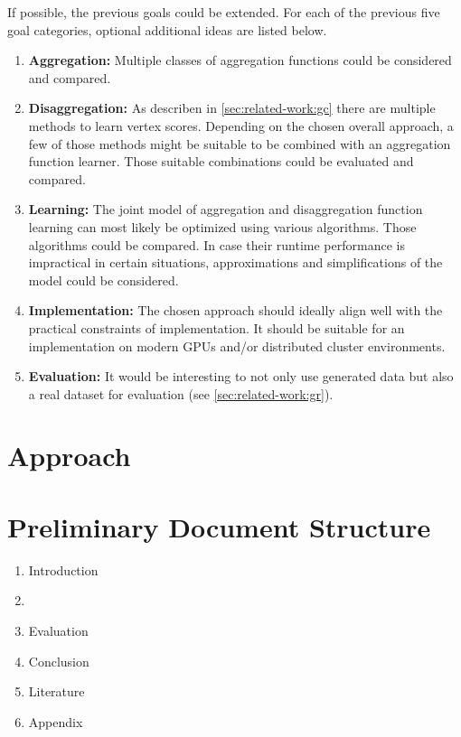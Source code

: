 \documentclass[12pt]{scrartcl}
\begin{document}
If possible, the previous goals could be extended.
For each of the previous five goal categories, optional additional ideas are listed below.
\begin{enumerate}[label=\textbf{\arabic*.}]
	\item \textbf{Aggregation:}
		Multiple classes of aggregation functions could be considered and compared.
	\item \textbf{Disaggregation:}
		As describen in \cref{sec:related-work:gc} there are multiple methods to learn vertex scores.
		Depending on the chosen overall approach, a few of those methods might be suitable to be combined with an aggregation function learner.
		Those suitable combinations could be evaluated and compared.
	\item \textbf{Learning:}
		The joint model of aggregation and disaggregation function learning can most likely be optimized using various algorithms.
		Those algorithms could be compared.
		In case their runtime performance is impractical in certain situations, approximations and simplifications of the model could be considered.
	\item \textbf{Implementation:}
		The chosen approach should ideally align well with the practical constraints of implementation.
		It should be suitable for an implementation on modern GPUs and/or distributed cluster environments.
	\item \textbf{Evaluation:}
		It would be interesting to not only use generated data but also a real dataset for evaluation (see \cref{sec:related-work:gr}).
\end{enumerate}

\section{Approach}%
\label{sec:approach}

\section{Preliminary Document Structure}%
\label{sec:doc-structure}

\begin{enumerate}
	\item Introduction
	\item
	\item Evaluation
	\item Conclusion
	\item Literature
	\item Appendix
\end{enumerate}
\end{document}
